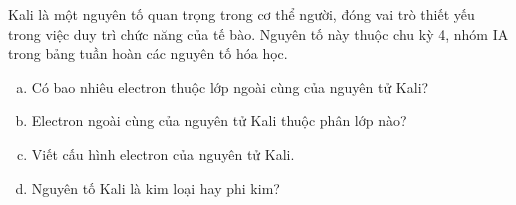 \begin{bt}%
	Kali là một nguyên tố quan trọng trong cơ thể người, đóng vai trò thiết yếu trong việc duy trì chức năng của tế bào. Nguyên tố này thuộc chu kỳ 4, nhóm IA trong bảng tuần hoàn các nguyên tố hóa học.
	\begin{enumerate}[a)]
		\item Có bao nhiêu electron thuộc lớp ngoài cùng của nguyên tử Kali?
		\item Electron ngoài cùng của nguyên tử Kali thuộc phân lớp nào?
		\item Viết cấu hình electron của nguyên tử Kali.
		\item Nguyên tố Kali là kim loại hay phi kim?
	\end{enumerate}
\end{bt}
